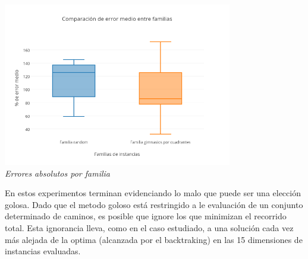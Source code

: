\vspace*{0.3cm} \vspace*{0.3cm}
  \begin{center}
 \includegraphics[width=0.75\textwidth]{./EJ2/box2.png}
\\{\textit{Errores absolutos por familia}}
\end{center}


En estos experimentos terminan evidenciando lo malo que puede ser una elección golosa. Dado que el metodo goloso está restringido a le evaluación de un conjunto determinado de caminos, es posible que ignore los que minimizan el recorrido total. Esta ignorancia lleva, como en el caso estudiado, a una solución cada vez más alejada de la optima (alcanzada por el backtraking) en las 15 dimensiones de instancias evaluadas.
